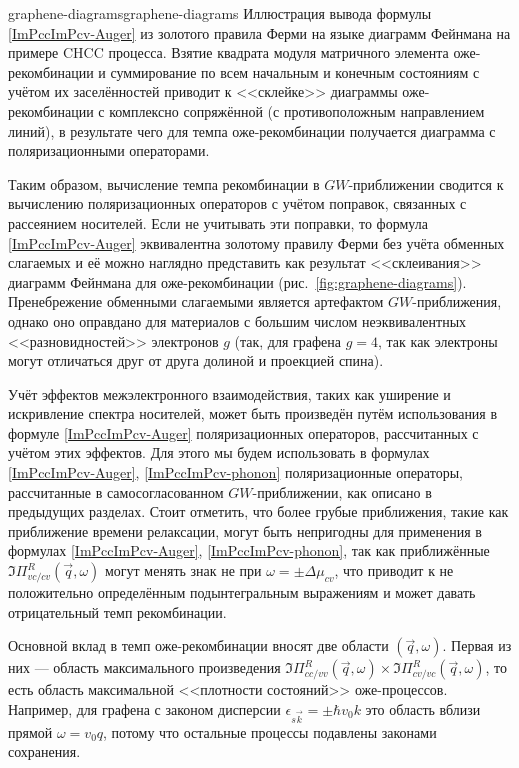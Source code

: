 \begin{fig}{graphene-diagrams}{graphene-diagrams} Иллюстрация вывода формулы \eqref{ImPccImPcv-Auger} из золотого правила Ферми на языке диаграмм Фейнмана на примере CHCC процесса. Взятие квадрата модуля матричного элемента оже-рекомбинации и суммирование по всем начальным и конечным состояниям с учётом их заселённостей приводит к <<склейке>> диаграммы оже-рекомбинации с комплексно сопряжённой (с противоположным направлением линий), в результате чего для темпа оже-рекомбинации получается диаграмма с поляризационными операторами.
\end{fig}

Таким образом, вычисление темпа рекомбинации в $GW$-приближении сводится к вычислению поляризационных операторов с учётом поправок, связанных с рассеянием носителей. Если не учитывать эти поправки, то формула \eqref{ImPccImPcv-Auger} эквивалентна золотому правилу Ферми без учёта обменных слагаемых и её можно наглядно представить как результат <<склеивания>> диаграмм Фейнмана для оже-рекомбинации (рис.~\ref{fig:graphene-diagrams}). Пренебрежение обменными слагаемыми является артефактом $GW$-приближения, однако оно оправдано для материалов с большим числом неэквивалентных <<разновидностей>> электронов $g$ (так, для графена $g = 4$, так как электроны могут отличаться друг от друга долиной и проекцией спина).

Учёт эффектов межэлектронного взаимодействия, таких как уширение и искривление спектра носителей, может быть произведён путём использования в формуле \eqref{ImPccImPcv-Auger} поляризационных операторов, рассчитанных с учётом этих эффектов. Для этого мы будем использовать в формулах \eqref{ImPccImPcv-Auger}, \eqref{ImPccImPcv-phonon} поляризационные операторы, рассчитанные в самосогласованном $GW$-приближении, как описано в предыдущих разделах. Стоит отметить, что более грубые приближения, такие как приближение времени релаксации, могут быть непригодны для применения в формулах \eqref{ImPccImPcv-Auger}, \eqref{ImPccImPcv-phonon}, так как приближённые $\Im\Pi^{R}_{vc/cv}(\vec{q},\omega)$ могут менять знак не при $\omega = \pm \Delta\mu_{cv}$, что приводит к не положительно определённым подынтегральным выражениям и может давать отрицательный темп рекомбинации.

Основной вклад в темп оже-рекомбинации вносят две области $(\vec{q},\omega)$. Первая из них --- область максимального произведения $\Im\Pi^{R}_{cc/vv}(\vec{q},\omega) \times \Im\Pi^{R}_{cv/vc}(\vec{q},\omega)$, то есть область максимальной <<плотности состояний>> оже-процессов. Например, для графена с законом дисперсии $\epsilon_{s \vec{k}} = \pm \hbar v_0 k$ это область вблизи прямой $\omega = v_0 q$, потому что остальные процессы подавлены законами сохранения.

